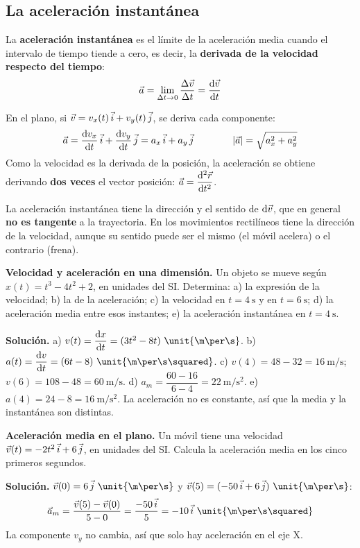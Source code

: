 \subsection{La aceleración instantánea}

\begin{definition}
    La \textbf{aceleración instantánea} es el límite de la aceleración media cuando el intervalo de tiempo tiende a cero, es decir,
    la \textbf{derivada de la velocidad respecto del tiempo}:
    \[ \vec a = \lim_{\Delta t \to 0} \frac{\Delta\vec v}{\Delta t} = \frac{\mathrm{d}\vec v}{\mathrm{d} t} \]
\end{definition}

En el plano, si \(\vec v = v_x(t)\,\vec{i} + v_y(t)\,\vec{j}\), se deriva cada componente:
\[ \vec a = \frac{\mathrm{d} v_x}{\mathrm{d} t}\,\vec{i} + \frac{\mathrm{d} v_y}{\mathrm{d} t}\,\vec{j} = a_x\,\vec{i} + a_y\,\vec{j} \qquad\qquad |\vec a| = \sqrt{a_x^2 + a_y^2} \]
Como la velocidad es la derivada de la posición, la aceleración se obtiene derivando \textbf{dos veces} el vector posición:
\(\vec a = \dfrac{\mathrm{d}^2\vec r}{\mathrm{d} t^2}\).

La aceleración instantánea tiene la dirección y el sentido de \(\mathrm{d}\vec v\), que en general \textbf{no es tangente} a la
trayectoria. En los movimientos rectilíneos tiene la dirección de la velocidad, aunque su sentido puede ser el mismo (el móvil
acelera) o el contrario (frena).

\begin{example}
    \textbf{Velocidad y aceleración en una dimensión.} Un objeto se mueve según \(x(t) = t^3 - 4t^2 + 2\), en unidades del SI.
    Determina: a) la expresión de la velocidad; b) la de la aceleración; c) la velocidad en \(t = \qty{4}{\s}\) y en
    \(t = \qty{6}{\s}\); d) la aceleración media entre esos instantes; e) la aceleración instantánea en \(t = \qty{4}{\s}\).

    \textbf{Solución.} a) \(v(t) = \dfrac{\dif x}{\dif t} = (3t^2 - 8t)~\unit{\m\per\s}\). b) \(a(t) = \dfrac{\dif v}{\dif t} =
    (6t - 8)~\unit{\m\per\s\squared}\). c) \(v(4) = 48 - 32 = \qty{16}{\m\per\s}\); \(v(6) = 108 - 48 = \qty{60}{\m\per\s}\).
    d) \(a_m = \dfrac{60 - 16}{6 - 4} = \qty{22}{\m\per\s\squared}\). e) \(a(4) = 24 - 8 = \qty{16}{\m\per\s\squared}\).
    La aceleración no es constante, así que la media y la instantánea son distintas.
\end{example}

\begin{example}
    \textbf{Aceleración media en el plano.} Un móvil tiene una velocidad \(\vec v(t) = -2t^2\,\vec{i} + 6\,\vec{j}\), en unidades del
    SI. Calcula la aceleración media en los cinco primeros segundos.

    \textbf{Solución.} \(\vec v(0) = 6\,\jvec~\unit{\m\per\s}\) y \(\vec v(5) = (-50\,\ivec + 6\,\jvec)~\unit{\m\per\s}\):
    \[ \vec a_m = \frac{\vec v(5) - \vec v(0)}{5 - 0} = \frac{-50\,\ivec}{5} = -10\,\ivec~\unit{\m\per\s\squared} \]
    La componente \(v_y\) no cambia, así que solo hay aceleración en el eje X.
\end{example}


